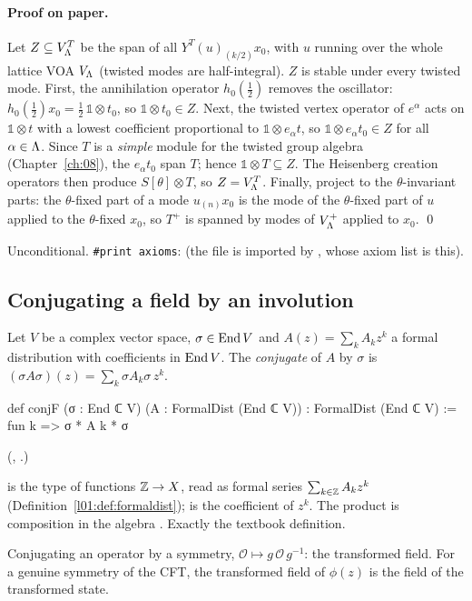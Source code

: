 \paragraph{Proof on paper.}  Let $Z\subseteq V_{\Lambda}^T$ be the span of all $Y^T(u)_{(k/2)}x_0$,
with $u$ running over the whole lattice VOA $V_{\Lambda}$ (twisted modes are half-integral).  $Z$ is
stable under every twisted mode.  First, the annihilation operator $h_0(\tfrac12)$ removes the
oscillator: $h_0(\tfrac12)x_0=\tfrac12\,\mathbb 1\otimes t_0$, so $\mathbb 1\otimes t_0\in Z$.  Next,
the twisted vertex operator of $e^\alpha$ acts on $\mathbb 1\otimes t$ with a lowest coefficient
proportional to $\mathbb 1\otimes e_\alpha t$, so $\mathbb 1\otimes e_\alpha t_0\in Z$ for all
$\alpha\in{\Lambda}$.  Since $T$ is a \emph{simple} module for the twisted group algebra
(Chapter~\ref{ch:08}), the $e_\alpha t_0$ span $T$; hence $\mathbb 1\otimes T\subseteq Z$.  The
Heisenberg creation operators then produce $S[\theta]\otimes T$, so $Z=V_{\Lambda}^T$.  Finally,
project to the $\theta$-invariant parts: the $\theta$-fixed part of a mode $u_{(n)}x_0$ is the mode
of the $\theta$-fixed part of $u$ applied to the $\theta$-fixed $x_0$, so $T^+$ is spanned by modes of
$V_{\Lambda}^+$ applied to $x_0$. \qed

\begin{status}
Unconditional.  \texttt{\#print axioms}:  (the file is
imported by , whose axiom list is this).
\end{status}

\subsection{Conjugating a field by an involution}

\begin{definition}\label{ch14:def:conjF}
Let $V$ be a complex vector space, $\sigma\in\operatorname{End} V$ and $A(z)=\sum_k A_k z^k$ a formal
distribution with coefficients in $\operatorname{End} V$.  The \emph{conjugate} of $A$ by $\sigma$ is
$(\sigma A\sigma)(z)=\sum_k \sigma A_k\sigma\, z^k$.
\end{definition}
\begin{leancode}
def conjF (σ : End ℂ V) (A : FormalDist (End ℂ V)) : FormalDist (End ℂ V) :=
  fun k => σ * A k * σ
\end{leancode}
(, .)

\begin{dictionary}
 is the type of functions ${\mathbb{Z}}\to X$, read as formal series
$\sum_{k\in{\mathbb{Z}}}A_kz^k$ (Definition~\ref{l01:def:formaldist});  is the coefficient of $z^k$.  The product
 is composition in the algebra .  Exactly the textbook definition.
\end{dictionary}
\begin{physics}
Conjugating an operator by a symmetry, $\mathcal O\mapsto g\,\mathcal O\,g^{-1}$: the transformed field. For a genuine symmetry of the CFT, the transformed field of $\phi(z)$ is the field of the transformed state.
\end{physics}


